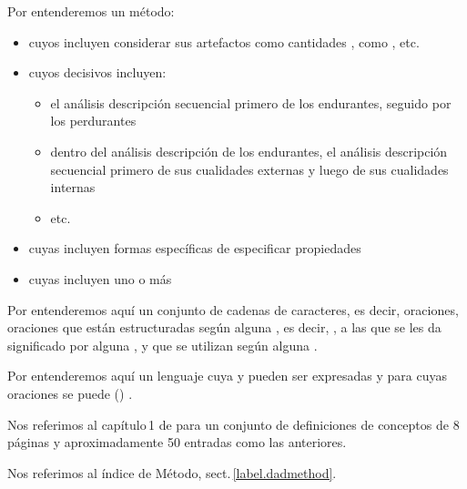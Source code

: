 \pind Por  entenderemos un método:
\begin{itemize}
\item cuyos  incluyen considerar sus artefactos como %
      cantidades , como , etc.
\item cuyos  decisivos incluyen:
\begin{itemize}
\item el análisis
      \ysfchg{\&} descripción secuencial primero de los endurantes, seguido por los perdurantes
\item dentro del análisis \ysfchg{\&} descripción de los endurantes,
      el análisis \ysfchg{\&} descripción secuencial primero de sus cualidades externas y luego de sus cualidades internas
\item etc.
\end{itemize}
\item cuyas  incluyen formas específicas de
       especificar propiedades
\item cuyas  incluyen uno o más
\end{itemize}
\mnewfoil

\noindent
\begynd
\pind Por  entenderemos aquí \nyl un conjunto de
cadenas de caracteres, es decir, oraciones,
\begynd
\pind oraciones que están estructuradas según alguna ,
      es decir, ,
\pind a las que se les da significado por alguna ,
\pind y que se utilizan según alguna . 
\afslut
\afslut

\begynd
\pind Por  entenderemos aquí un lenguaje
\begynd
\pind cuya  y  pueden ser expresadas
\pind y para cuyas oraciones se puede  %
      () . 
\afslut

\pind Nos referimos al capítulo\,1 de \cite{BjornerMonograph2020} para un conjunto de
      definiciones de conceptos de 8 páginas y aproximadamente 50 entradas como las anteriores.
      
\pind Nos referimos al índice de \textsf{Método}, sect.\,\vref{label.dadmethod}.
\afslut
      
